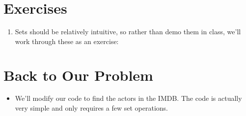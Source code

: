 \documentclass[letterpaper,10pt,english]{sphinxmanual}
\begin{document}
\section{Exercises}
\label{\detokenize{lecture_notes/lec15_sets:exercises}}\begin{enumerate}
\item {} 
Sets should be relatively intuitive, so rather than demo them in
class, we’ll work through these as an exercise:

%
\begin{sphinxVerbatim}[commandchars=\\\{\}]
  




  


  


  


  


  


  
  
\end{sphinxVerbatim}

\end{enumerate}


\section{Back to Our Problem}
\label{\detokenize{lecture_notes/lec15_sets:back-to-our-problem}}\begin{itemize}
\item {} 
We’ll modify our code to find the actors in the IMDB. The code is
actually very simple and only requires a few set operations.

\end{itemize}
\end{document}
